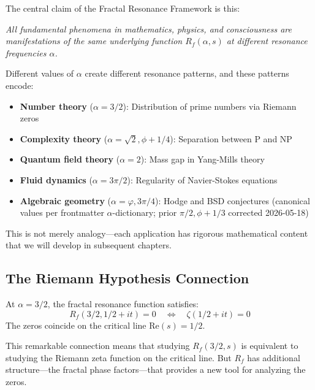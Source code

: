 \begin{keyidea}
The central claim of the Fractal Resonance Framework is this:

\textit{All fundamental phenomena in mathematics, physics, and consciousness are manifestations of the same underlying function $R_f(\alpha, s)$ at different resonance frequencies $\alpha$.}

Different values of $\alpha$ create different resonance patterns, and these patterns encode:
\begin{itemize}
\item \textbf{Number theory} ($\alpha = 3/2$): Distribution of prime numbers via Riemann zeros
\item \textbf{Complexity theory} ($\alpha = \sqrt{2}, \phi+1/4$): Separation between P and NP
\item \textbf{Quantum field theory} ($\alpha = 2$): Mass gap in Yang-Mills theory
\item \textbf{Fluid dynamics} ($\alpha = 3\pi/2$): Regularity of Navier-Stokes equations
\item \textbf{Algebraic geometry} ($\alpha = \varphi, 3\pi/4$): Hodge and BSD conjectures (canonical values per frontmatter $\alpha$-dictionary; prior $\pi/2, \phi+1/3$ corrected 2026-05-18)
\end{itemize}

This is not merely analogy—each application has rigorous mathematical content that we will develop in subsequent chapters.
\end{keyidea}

\subsection{The Riemann Hypothesis Connection}

\begin{theorem}[RH Resonance]
\label{thm:rh-resonance}
At $\alpha = 3/2$, the fractal resonance function satisfies:
\begin{equation}
R_f(3/2, 1/2 + it) = 0 \quad \Leftrightarrow \quad \zeta(1/2 + it) = 0
\end{equation}
The zeros coincide on the critical line $\text{Re}(s) = 1/2$.
\end{theorem}

This remarkable connection means that studying $R_f(3/2, s)$ is equivalent to studying the Riemann zeta function on the critical line. But $R_f$ has additional structure—the fractal phase factors—that provides a new tool for analyzing the zeros.

